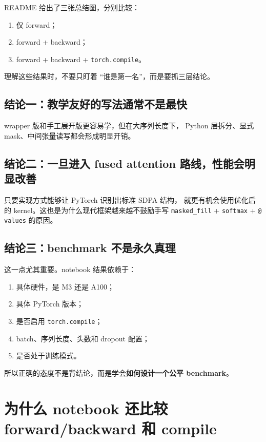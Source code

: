 \documentclass[12pt,a4paper]{ctexart}
\newcommand{\code}[1]{\texttt{#1}}
\begin{document}
README 给出了三张总结图，分别比较：

\begin{enumerate}
  \item 仅 forward；
  \item forward + backward；
  \item forward + backward + \code{torch.compile}。
\end{enumerate}

理解这些结果时，不要只盯着 ``谁是第一名''，而是要抓三层结论。

\subsection{结论一：教学友好的写法通常不是最快}

wrapper 版和手工展开版更容易学，但在大序列长度下，
Python 层拆分、显式 mask、中间张量读写都会形成明显开销。

\subsection{结论二：一旦进入 fused attention 路线，性能会明显改善}

只要实现方式能够让 PyTorch 识别出标准 SDPA 结构，
就更有机会使用优化后的 kernel。这也是为什么现代框架越来越不鼓励手写
\code{masked\_fill} + \code{softmax} + \code{@ values} 的原因。

\subsection{结论三：benchmark 不是永久真理}

这一点尤其重要。notebook 结果依赖于：

\begin{enumerate}
  \item 具体硬件，是 M3 还是 A100；
  \item 具体 PyTorch 版本；
  \item 是否启用 \code{torch.compile}；
  \item batch、序列长度、头数和 dropout 配置；
  \item 是否处于训练模式。
\end{enumerate}

所以正确的态度不是背结论，而是学会\textbf{如何设计一个公平 benchmark}。

\section{为什么 notebook 还比较 forward/backward 和 compile}
\end{document}

